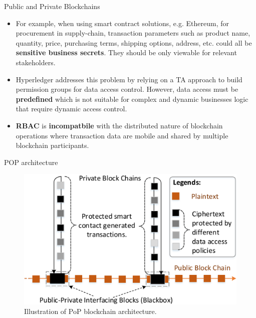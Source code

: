 \documentclass[11pt]{beamer}
\begin{document}
\begin{frame}[allowframebreaks]{Public and Private Blockchains}
\begin{itemize}
	\item For example, when using smart contract solutions, e.g. Ethereum\cite{ethereumweb}, for procurement in supply-chain, transaction parameters such as product name, quantity, price, purchasing terms, shipping options, address, etc. could all be \textbf{sensitive business secrets}. They should be only viewable for relevant stakeholders. 				\item Hyperledger\cite{cachin2016} addresses this problem by relying on a TA approach to build permission groups for data access control. However, data access must be \textbf{predefined} which is not suitable for complex and dynamic businesses logic that require dynamic access control.
	\item \textbf{RBAC} is \textbf{incompatbile} with the distributed nature of blockchain operations where transaction data are mobile and shared by multiple blockchain participants.
\end{itemize}

\end{frame}

\begin{frame}{POP architecture}

\begin{figure}[!ht]
\includegraphics[scale=0.25]{pop.png}
\caption{Illustration of PoP blockchain architecture.}
\label{fig:poparchitecture}
\end{figure}

\end{frame}
\end{document}
